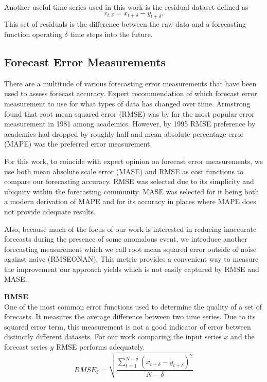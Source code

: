 Another useful time series used in this work is the residual dataset defined as
\begin{equation}
r_{t,\delta} =  x_{t + \delta} - y_{t + \delta}.
\end{equation}
This set of residuals is the difference between the raw data and a forecasting function operating $\delta$ time steps into the future. 


\subsection{Forecast Error Measurements}
There are a multitude of various forecasting error measurements that have been used to assess forecast accuracy.  Expert recommendation of which forecast error measurement to use for what types of data has changed over time.  Armstrong \cite{Armstrong2001, Yokuma1995} found that root mean squared error (RMSE) was by far the most popular error measurement in 1981 among academics.  However, by 1995 RMSE preference by academics had dropped by roughly half and mean absolute percentage error (MAPE) was the preferred error measurement. 

For this work, to coincide with expert opinion on forecast error measurements, we use both mean absolute scale error (MASE) \cite{Hyndman2006, Hyndman2006a} and RMSE as cost functions to compare our forecasting accuracy.  RMSE was selected due to its simplicity and ubiquity within the forecasting community.  MASE was selected for it being both a modern derivation of MAPE and for its accuracy in places where MAPE does not provide adequate results.  

Also, because much of the focus of our work is interested in reducing inaccurate forecasts during the presence of some anomalous event, we introduce another forecasting measurement which we call root mean squared error outside of noise against naive (RMSEONAN).  This metric provides a convenient way to measure the improvement our approach yields which is not easily captured by RMSE and MASE.

\bigskip
\noindent \textbf{RMSE} \\
One of the most common error functions used to determine the quality of a set of forecasts.  It measures the average difference between two time series.  Due to its squared error term, this measurement is not a good indicator of error between distinctly different datasets.  For our work comparing the input series $x$ and the forecast series $y$ RMSE performs adequately.
\begin{equation}
RMSE_{\delta} = \sqrt{\frac{\sum_{t = 1}^{N - \delta}{(x_{t + \delta} - y_{t + \delta})^{2}}}{N - \delta}}
\end{equation}

